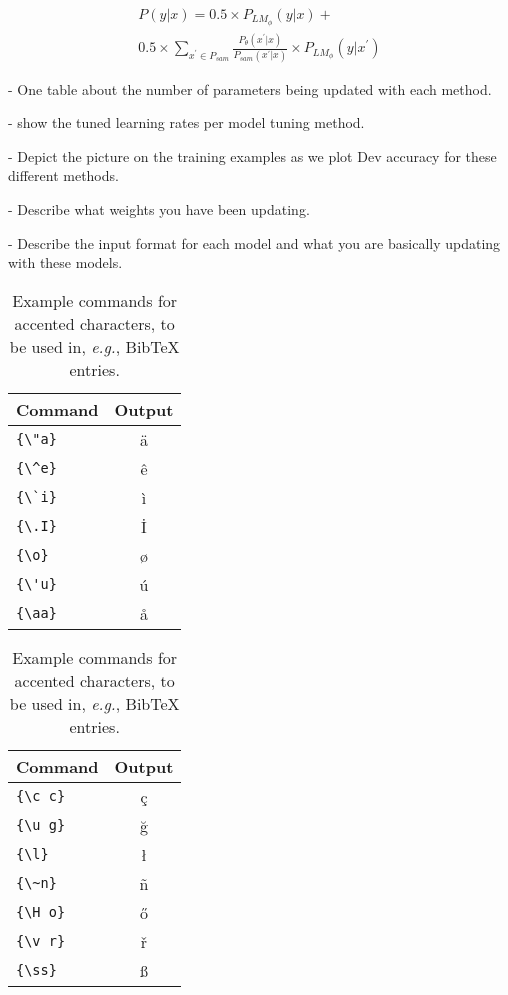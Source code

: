 \documentclass[11pt]{article}
\begin{document}
\begin{multline}
P(y|x) = 0.5 \times P_{LM_{\phi}}(y|x) + \\
0.5 \times \sum_{x^{'} \in P_{sam}} \frac{P_{\theta}(x^{'} | x)}{P_{sam}(x^{'} | x)} \times P_{LM_{\phi}}(y | x^{'})
\end{multline}

- One table about the number of parameters being updated with each method.

- show the tuned learning rates per model tuning method.

- Depict the picture on the training examples as we plot Dev accuracy for these different methods.


- Describe what weights you have been updating.

- Describe the input format for each model and what you are basically updating with these models.


\begin{table}
\centering
\begin{tabular}{lc}
\hline
\textbf{Command} & \textbf{Output}\\
\hline
\verb|{\"a}| & {\"a} \\
\verb|{\^e}| & {\^e} \\
\verb|{\`i}| & {\`i} \\
\verb|{\.I}| & {\.I} \\
\verb|{\o}| & {\o} \\
\verb|{\'u}| & {\'u}  \\
\verb|{\aa}| & {\aa}  \\\hline
\end{tabular}
\begin{tabular}{lc}
\hline
\textbf{Command} & \textbf{Output}\\
\hline
\verb|{\c c}| & {\c c} \\
\verb|{\u g}| & {\u g} \\
\verb|{\l}| & {\l} \\
\verb|{\~n}| & {\~n} \\
\verb|{\H o}| & {\H o} \\
\verb|{\v r}| & {\v r} \\
\verb|{\ss}| & {\ss} \\
\hline
\end{tabular}
\caption{Example commands for accented characters, to be used in, \emph{e.g.}, Bib\TeX{} entries.}
\label{tab:accents}
\end{table}
\end{document}
